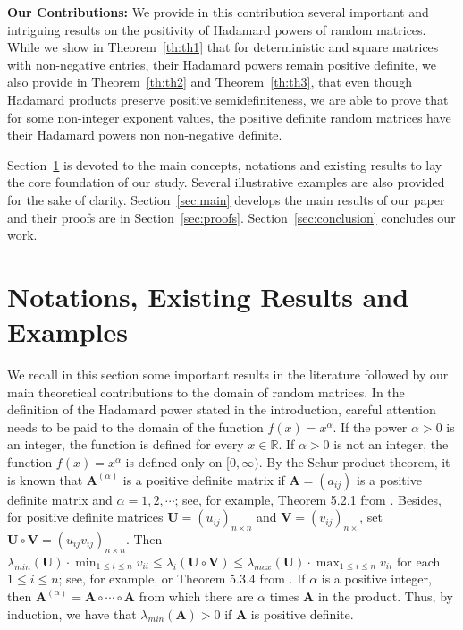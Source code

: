 \documentclass[conference,letterpaper]{IEEEtran}
\numberwithin{equation}{section}
\newcommand{\lbl}{\label}
\begin{document}

\textbf{Our Contributions: }
We provide in this contribution several important and intriguing results on the positivity of Hadamard powers of random matrices. 
While we show in Theorem~\ref{th:th1} that for deterministic and square matrices with non-negative entries, their Hadamard powers remain positive definite, we also provide in Theorem~\ref{th:th2} and Theorem~\ref{th:th3}, that even though Hadamard products preserve positive semidefiniteness, we are able to prove that for some non-integer exponent values, the positive definite random matrices have their Hadamard powers non non-negative definite.


Section~\ref{sec:notations} is devoted to the main concepts, notations and existing results to lay the core foundation of our study.
Several illustrative examples are also provided for the sake of clarity.
Section~\ref{sec:main} develops the main results of our paper and their proofs are in Section~\ref{sec:proofs}.
Section~\ref{sec:conclusion} concludes our work.

\section{Notations, Existing Results and Examples}\lbl{sec:notations}
We recall in this section some important results in the literature followed by our main theoretical contributions to the domain of random matrices.
In the definition of the Hadamard power stated in the introduction, careful attention needs to be paid to the domain of the function $f(x)=x^{\alpha}$. 
If the power $\alpha>0$ is an integer, the function is defined for every $x\in \mathbb{R}.$ If $\alpha>0$ is not an integer, the function $f(x)=x^{\alpha}$ is defined only on $[0, \infty).$ By the Schur product theorem, it is known that $\mathbf{A}^{(\alpha)}$ is a positive definite matrix if $\mathbf{A}=(a_{ij})$ is a positive definite matrix and $\alpha =1,2, \cdots$; see, for example, Theorem 5.2.1 from \cite{horn_johnson_1991}. 
Besides, for positive definite matrices $\mathbf{U}=(u_{ij})_{n\times n}$ and $\mathbf{V}=(v_{ij})_{n\times}$, set $\mathbf{U}\circ \mathbf{V}=(u_{ij}v_{ij})_{n\times n}$. 
Then  $\lambda_{min}(\mathbf{U})\cdot\min_{1\leq i \leq n}{v_{ii}}\leq \lambda_i(\mathbf{U}\circ \mathbf{V})\leq \lambda_{max}(\mathbf{U})\cdot\max_{1\leq i \leq n}{v_{ii}}$ for each $1\leq i \leq n$; see, for example, \cite{schur1911bemerkungen} or Theorem 5.3.4 from \cite{horn_johnson_1991}. 
If $\alpha$ is a positive integer, then  $\mathbf{A}^{(\alpha)}=\mathbf{A}\circ\cdots\circ\mathbf{A}$ from which there are $\alpha$ times $\mathbf{A}$ in the product. Thus, by induction, we have that $\lambda_{min}(\mathbf{A})>0$ if $\mathbf{A}$ is positive definite.
\end{document}

